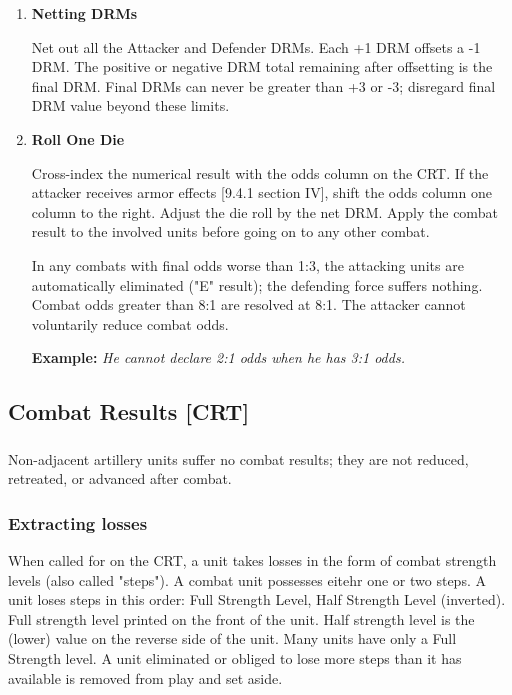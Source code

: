 \begin{enumerate}[label=\textbf{\Roman*.}]
    \item \textbf{Netting DRMs}
    
    Net out all the Attacker and Defender DRMs. Each +1 DRM offsets a -1 DRM. The positive or negative DRM total remaining after offsetting is the final DRM. Final DRMs can never be greater than +3 or -3; disregard final DRM value beyond these limits.
    
    \item \textbf{Roll One Die}
    
    Cross-index the numerical result with the odds column on the CRT. If the attacker receives armor effects [9.4.1 section IV], shift the odds column one column to the right. Adjust the die roll by the net DRM. Apply the combat result to the involved units before going on to any other combat.
    
    In any combats with final odds worse than 1:3, the attacking units are automatically eliminated ("E" result); the defending force suffers nothing. Combat odds greater than 8:1 are resolved at 8:1. The attacker cannot voluntarily reduce combat odds.
    
    \textbf{Example:} \textit{He cannot declare 2:1 odds when he has 3:1 odds.}
\end{enumerate}

\subsection{Combat Results [CRT]}
\subsubsection{}
Non-adjacent artillery units suffer no combat results; they are not reduced, retreated, or advanced after combat.

\subsubsection{\textbf{Extracting losses}}
When called for on the CRT, a unit takes losses in the form of combat strength levels (also called "steps"). A combat unit possesses eitehr one or two steps. A unit loses steps in this order: Full Strength Level, Half Strength Level (inverted). Full strength level printed on the front of the unit. Half strength level is the (lower) value on the reverse side of the unit. Many units have only a Full Strength level. A unit eliminated or obliged to lose more steps than it has available is removed from play and set aside.